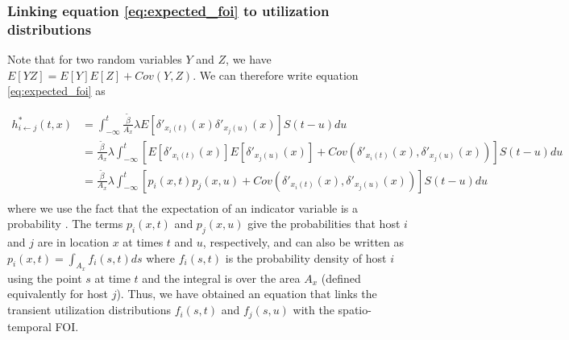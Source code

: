 \documentclass[letterpaper]{article}
\begin{document}
\subsubsection*{Linking equation \ref{eq:expected_foi} to utilization distributions}

Note that for two random variables $Y$ and $Z$, we have $E[YZ] = E[Y]E[Z] + Cov(Y, Z)$.  We can therefore write equation \ref{eq:expected_foi} as

\begin{equation}
    \begin{aligned}
        h^*_{i \leftarrow j}(t, x) &= \int_{-\infty}^{t} \frac{\tilde{\beta}}{A_x} \lambda E[\delta'_{x_i(t)}(x) \delta'_{x_j(u)}(x)] S(t - u) du \\
        &= \frac{\tilde{\beta}}{A_x} \lambda \int_{-\infty}^{t} [E[\delta'_{x_i(t)}(x)] E[\delta'_{x_j(u)}(x)] + Cov(\delta'_{x_i(t)}(x), \delta'_{x_j(u)}(x))] S(t - u) du \\
        &= \frac{\tilde{\beta}}{A_x} \lambda \int_{-\infty}^{t} [p_i(x, t) p_j(x, u) + Cov(\delta'_{x_i(t)}(x), \delta'_{x_j(u)}(x))] S(t - u) du \\
    \end{aligned}
    \label{eq:foi_cov}
\end{equation}
where we use the fact that the expectation of an indicator variable is a probability \citep{Grimmett2001}. The terms $p_i(x, t)$ and $p_j(x,u)$ give the probabilities that host $i$ and $j$ are in location $x$ at times $t$ and $u$, respectively, and can also be written as $p_i(x, t) = \int_{A_x} f_i(s, t) ds$ where $f_i(s, t)$ is the probability density of host $i$ using the point $s$ at time $t$ and the integral is over the area $A_x$ (defined equivalently for host $j$). Thus, we have obtained an equation that links the transient utilization distributions $f_i(s, t)$ and $f_j(s, u)$ with the spatio-temporal FOI.


\end{document}
